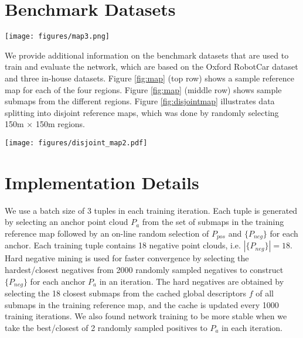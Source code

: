 \documentclass[10pt,twocolumn,letterpaper]{article}
\begin{document}
	\section{Benchmark Datasets}
	\begin{figure*}
		\begin{center}
			\texttt{[image: figures/map3.png]}
		\end{center}
		\caption{Top row shows a sample reference map from (a) Oxford, (b) U.S., (c) R.A and (d) B.D.. Middle row shows a sample submap from each of the regions representing the local area marked by the red box on the reference map. Bottom row shows the corresponding preprocessed submaps of the local areas from the middle row. }
		\label{fig:map}
	\end{figure*}
	We provide additional information on the benchmark datasets that are used to train and evaluate the network, which are based on the Oxford RobotCar dataset \cite{RobotCarDatasetIJRR} and three in-house datasets. Figure \ref{fig:map} (top row) shows a sample reference map for each of the four regions. Figure \ref{fig:map} (middle row) shows sample submaps from the different regions. Figure \ref{fig:disjointmap} illustrates data splitting into disjoint reference maps, which was done by randomly selecting 150m $\times$ 150m regions.
	\newline
	\begin{figure*}
		\begin{center}
			\texttt{[image: figures/disjoint\_map2.pdf]}
		\end{center}
		\caption{Data splitting: Blue points represent submaps in the training reference map and red points represent submaps in the testing reference map. The data split was done by randomly selecting regions in the full reference map. }
		\label{fig:disjointmap}
	\end{figure*}

	\section{Implementation Details}
	We use a batch size of 3 tuples in each training iteration. Each tuple is generated by selecting an anchor point cloud $P_a$ from the set of submaps in the training reference map followed by an on-line random selection of $P_{pos}$ and $\{P_{neg}\}$ for each anchor. Each training tuple contains 18 negative point clouds, i.e. $|\{P_{neg}\}|=18$. Hard negative mining is used for faster convergence by selecting the hardest/closest negatives from 2000 randomly sampled negatives to construct $\{P_{neg}\}$ for each anchor $P_a$ in an iteration. The hard negatives are obtained by selecting the 18 closest submaps from the cached global descriptors $f$ of all submaps in the training reference map, and the cache is updated every 1000 training iterations. We also found network training to be more stable when we take the best/closest of 2 randomly sampled positives to $P_a$ in each iteration.
	
\end{document}

